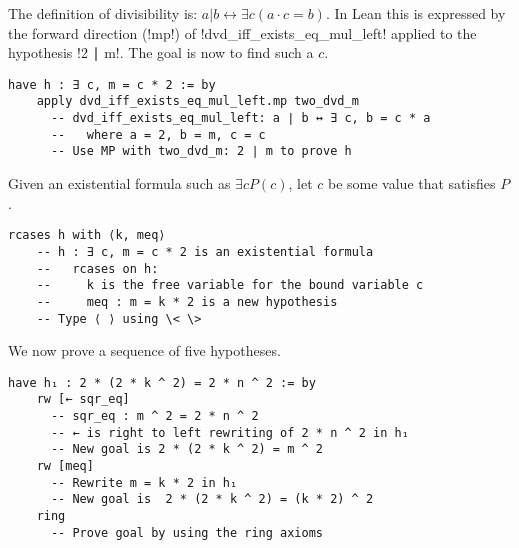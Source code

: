 The definition of divisibility is: $a|b\leftrightarrow \exists c ( a\cdot c = b)$. In Lean this is expressed by the forward direction (!mp!) of !dvd_iff_exists_eq_mul_left! applied to the hypothesis !2 ∣ m!. The goal is now to find such a $c$.
\begin{Verbatim}[firstnumber=last]
  have h : ∃ c, m = c * 2 := by
    apply dvd_iff_exists_eq_mul_left.mp two_dvd_m
      -- dvd_iff_exists_eq_mul_left: a ∣ b ↔ ∃ c, b = c * a
      --   where a = 2, b = m, c = c
      -- Use MP with two_dvd_m: 2 ∣ m to prove h
\end{Verbatim}
Given an existential formula such as $\exists c P(c)$, let $c$ be some value that satisfies $P$.
\begin{Verbatim}[firstnumber=last]
  rcases h with ⟨k, meq⟩
    -- h : ∃ c, m = c * 2 is an existential formula
    --   rcases on h:
    --     k is the free variable for the bound variable c
    --     meq : m = k * 2 is a new hypothesis
    -- Type ⟨ ⟩ using \< \>
\end{Verbatim}

\label{p.rcases}

\begin{center}
\setlength{\fboxrule}{1pt}
\end{center}

We now prove a sequence of five hypotheses.
\begin{Verbatim}[firstnumber=last]
  have h₁ : 2 * (2 * k ^ 2) = 2 * n ^ 2 := by
    rw [← sqr_eq]
      -- sqr_eq : m ^ 2 = 2 * n ^ 2
      -- ← is right to left rewriting of 2 * n ^ 2 in h₁
      -- New goal is 2 * (2 * k ^ 2) = m ^ 2
    rw [meq]
      -- Rewrite m = k * 2 in h₁
      -- New goal is  2 * (2 * k ^ 2) = (k * 2) ^ 2
    ring
      -- Prove goal by using the ring axioms
\end{Verbatim}


